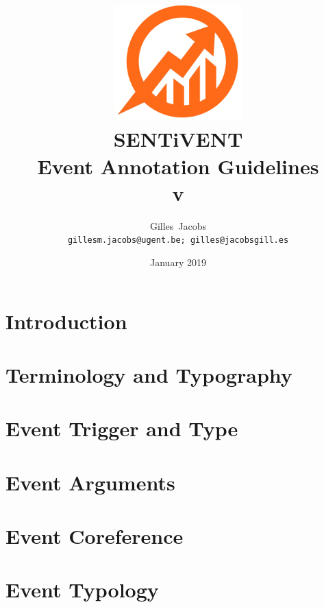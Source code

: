 \documentclass[a4paper]{report}
\title{
    \includegraphics[width=5cm]{img/semalyticslogonotext.png}\\
    [10pt]{\huge\bfseries {\Huge S{\huge ENT}i{\huge VENT}}\\
    Event Annotation Guidelines\\
    v\vhCurrentVersion\\
    \Large{\normalfont{Technical Report}}
    }
}
\author{Gilles~Jacobs \\ \small{\texttt{gillesm.jacobs@ugent.be; gilles@jacobsgill.es}}}
\date{January 2019}
\begin{document}
\maketitle
\tableofcontents
\newpage


\label{chapter/rev}

\chapter{Introduction}
\label{chapter/intro}


\chapter{Terminology and Typography}
\label{chapter/conventions}


\chapter{Event Trigger and Type}
\label{chapter/events}


\chapter{Event Arguments}
\label{chapter/arguments}


\chapter{Event Coreference}
\label{chapter/coref}


\chapter{Event Typology}
\label{chapter/eventtype}



\nocite{*}
\printbibliography[heading=bibintoc]
\end{document}
